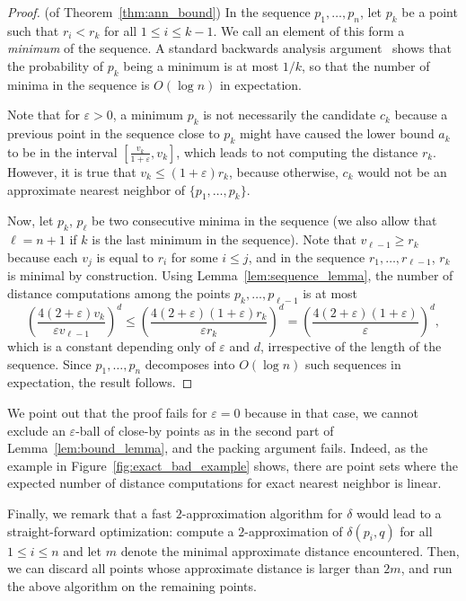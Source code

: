 \documentclass[a4paper,UKenglish,cleveref, autoref]{lipics-v2019}
\newcommand{\eps}{\varepsilon}
\newcommand{\dist}{\delta}
\begin{document}
\begin{proof} (of Theorem~\ref{thm:ann_bound})
%
In the sequence $p_1,\ldots,p_n$, let $p_k$ be a point 
such that $r_i<r_k$ for all $1\leq i\leq k-1$. We call an element
of this form a \emph{minimum} of the sequence. 
A standard backwards analysis argument~\cite{seidel-backwards} shows that the probability
of $p_k$ being a minimum is at most $1/k$, so that the number of minima
in the sequence is $O(\log n)$ in expectation.

Note that for $\eps>0$,
a minimum $p_k$ is not necessarily the candidate $c_k$ because a previous point
in the sequence close to $p_k$ might have caused the lower bound $a_k$ to be
in the interval $[\frac{v_k}{1+\eps},v_k]$, which leads to not
computing the distance $r_k$. However, it is true that
$v_k\leq (1+\eps)r_k$, because otherwise, $c_k$ would not be an approximate
nearest neighbor of $\{p_1,\ldots,p_k\}$.

Now, let $p_k$, $p_\ell$ be two consecutive minima in the sequence
(we also allow that $\ell=n+1$ if $k$ is the last minimum in the sequence).
Note that $v_{\ell-1}\geq r_k$ because each $v_j$ is equal to $r_i$ for
some $i\leq j$, and in the sequence $r_1,\ldots,r_{\ell-1}$, $r_k$
is minimal by construction. Using Lemma~\ref{lem:sequence_lemma},
the number of distance computations among the points
$p_k,\ldots,p_{\ell-1}$ is at most
\[
\left(\frac{4(2+\eps) v_k}{\eps v_{\ell-1}}\right)^{d}\leq \left(\frac{4(2+\eps)(1+\eps)r_k}{\eps r_k}\right)^{d}=\left(\frac{4(2+\eps)(1+\eps)}{\eps}\right)^{d},\]
which is a constant depending only of $\eps$ and $d$, irrespective of the length of the sequence.
Since $p_1,\ldots,p_n$ decomposes into $O(\log n)$ such sequences in expectation, the result follows.
\end{proof}

We point out that the proof fails for $\eps=0$ because in that case, we cannot exclude an $\eps$-ball
of close-by points as in the second part of Lemma~\ref{lem:bound_lemma}, and the packing argument fails.
Indeed, as the example in Figure~\ref{fig:exact_bad_example} shows, there are point sets where the expected number
of distance computations for exact nearest neighbor is linear.



Finally, we remark that a fast $2$-approximation algorithm for $\dist$ would lead to a straight-forward
optimization: compute a $2$-approximation of $\dist(p_i,q)$ for all $1\leq i\leq n$
and let $m$ denote the minimal approximate distance encountered. Then, we can discard all points
whose approximate distance is larger than $2m$, and run the above algorithm on the remaining points.
\end{document}
